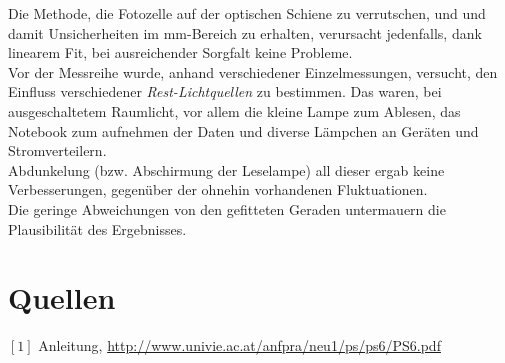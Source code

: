 \documentclass[12pt,a4paper]{article}
\begin{document}
\begin{multicols}{2}
Die Methode, die Fotozelle auf der optischen Schiene zu verrutschen, und und damit Unsicherheiten im mm-Bereich zu erhalten, verursacht jedenfalls, dank linearem Fit, bei ausreichender Sorgfalt keine Probleme.\\
Vor der Messreihe wurde, anhand verschiedener Einzelmessungen, versucht, den Einfluss verschiedener \emph{Rest-Lichtquellen} zu bestimmen. Das waren, bei ausgeschaltetem Raumlicht, vor allem die kleine Lampe zum Ablesen, das Notebook zum aufnehmen der Daten und diverse Lämpchen an Geräten und Stromverteilern.\\ Abdunkelung (bzw. Abschirmung der Leselampe) all dieser ergab keine Verbesserungen, gegenüber der ohnehin vorhandenen Fluktuationen.\\

Die geringe Abweichungen von den gefitteten Geraden untermauern die Plausibilität des Ergebnisses.


\section{Quellen}
$[1]$ Anleitung, \url{http://www.univie.ac.at/anfpra/neu1/ps/ps6/PS6.pdf}\\

\end{multicols}
\end{document}
